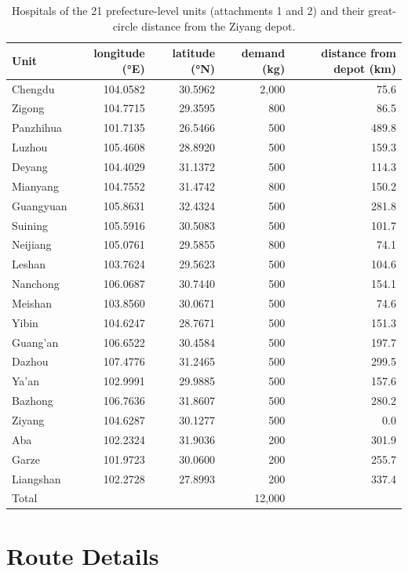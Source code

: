 \documentclass[11pt,a4paper]{article}
\theoremstyle{definition}
\begin{document}
\begin{table}[H]
\centering
\caption{Hospitals of the 21 prefecture-level units (attachments 1 and 2) and their great-circle distance from the Ziyang depot.}\label{tab:data}
\small
\begin{tabular}{lrrrr}
\toprule
Unit & longitude (°E) & latitude (°N) & demand (kg) & distance from depot (km) \\
\midrule
Chengdu & 104.0582 & 30.5962 & 2{,}000 & 75.6 \\
Zigong & 104.7715 & 29.3595 & 800 & 86.5 \\
Panzhihua & 101.7135 & 26.5466 & 500 & 489.8 \\
Luzhou & 105.4608 & 28.8920 & 500 & 159.3 \\
Deyang & 104.4029 & 31.1372 & 500 & 114.3 \\
Mianyang & 104.7552 & 31.4742 & 800 & 150.2 \\
Guangyuan & 105.8631 & 32.4324 & 500 & 281.8 \\
Suining & 105.5916 & 30.5083 & 500 & 101.7 \\
Neijiang & 105.0761 & 29.5855 & 800 & 74.1 \\
Leshan & 103.7624 & 29.5623 & 500 & 104.6 \\
Nanchong & 106.0687 & 30.7440 & 500 & 154.1 \\
Meishan & 103.8560 & 30.0671 & 500 & 74.6 \\
Yibin & 104.6247 & 28.7671 & 500 & 151.3 \\
Guang'an & 106.6522 & 30.4584 & 500 & 197.7 \\
Dazhou & 107.4776 & 31.2465 & 500 & 299.5 \\
Ya'an & 102.9991 & 29.9885 & 500 & 157.6 \\
Bazhong & 106.7636 & 31.8607 & 500 & 280.2 \\
Ziyang & 104.6287 & 30.1277 & 500 & 0.0 \\
Aba & 102.2324 & 31.9036 & 200 & 301.9 \\
Garze & 101.9723 & 30.0600 & 200 & 255.7 \\
Liangshan & 102.2728 & 27.8993 & 200 & 337.4 \\
\midrule
Total & & & 12{,}000 & \\
\bottomrule
\end{tabular}
\end{table}

\section{Route Details}\label{app:routes}
\end{document}
